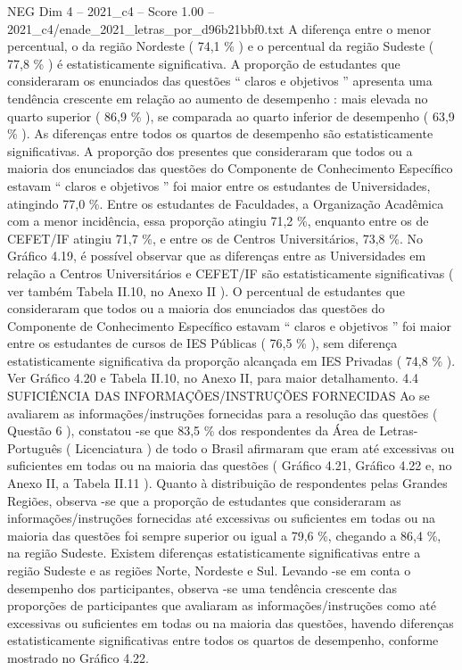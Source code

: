 \begin{textsample}{NEG Dim 4 – 2021\_c4 – Score 1.00 – 2021\_c4/enade\_2021\_letras\_por\_d96b21bbf0.txt}
A diferença entre o menor percentual, o da região Nordeste ( 74,1 \% ) e o percentual da região Sudeste ( 77,8 \% ) é estatisticamente significativa.
A proporção de estudantes que consideraram os enunciados das questões “ claros e objetivos ” apresenta uma tendência crescente em relação ao aumento de desempenho : mais elevada no quarto superior ( 86,9 \% ), se comparada ao quarto inferior de desempenho ( 63,9 \% ).
As diferenças entre todos os quartos de desempenho são estatisticamente significativas.
A proporção dos presentes que consideraram que todos ou a maioria dos enunciados das questões do Componente de Conhecimento Específico estavam “ claros e objetivos ” foi maior entre os estudantes de Universidades, atingindo 77,0 \%.
Entre os estudantes de Faculdades, a Organização Acadêmica com a menor incidência, essa proporção atingiu 71,2 \%, enquanto entre os de CEFET/IF atingiu 71,7 \%, e entre os de Centros Universitários, 73,8 \%.
No Gráfico 4.19, é possível observar que as diferenças entre as Universidades em relação a Centros Universitários e CEFET/IF são estatisticamente significativas ( ver também Tabela II.10, no Anexo II ).
O percentual de estudantes que consideraram que todos ou a maioria dos enunciados das questões do Componente de Conhecimento Específico estavam “ claros e objetivos ” foi maior entre os estudantes de cursos de IES Públicas ( 76,5 \% ), sem diferença estatisticamente significativa da proporção alcançada em IES Privadas ( 74,8 \% ).
Ver Gráfico 4.20 e Tabela II.10, no Anexo II, para maior detalhamento. 4.4 SUFICIÊNCIA DAS INFORMAÇÕES/INSTRUÇÕES FORNECIDAS Ao se avaliarem as informações/instruções fornecidas para a resolução das questões ( Questão 6 ), constatou -se que 83,5 \% dos respondentes da Área de Letras-Português ( Licenciatura ) de todo o Brasil afirmaram que eram até excessivas ou suficientes em todas ou na maioria das questões ( Gráfico 4.21, Gráfico 4.22 e, no Anexo II, a Tabela II.11 ).
Quanto à distribuição de respondentes pelas Grandes Regiões, observa -se que a proporção de estudantes que consideraram as informações/instruções fornecidas até excessivas ou suficientes em todas ou na maioria das questões foi sempre superior ou igual a 79,6 \%, chegando a 86,4 \%, na região Sudeste.
Existem diferenças estatisticamente significativas entre a região Sudeste e as regiões Norte, Nordeste e Sul.
Levando -se em conta o desempenho dos participantes, observa -se uma tendência crescente das proporções de participantes que avaliaram as informações/instruções como até excessivas ou suficientes em todas ou na maioria das questões, havendo diferenças estatisticamente significativas entre todos os quartos de desempenho, conforme mostrado no Gráfico 4.22.

\end{textsample}
